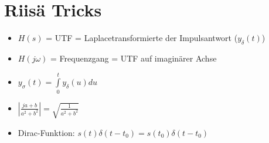 \section{Riisä Tricks}
\begin{itemize}
  \item $H(s)$ = UTF = Laplacetransformierte der Impulsantwort ($y_\delta(t)$)
  \item $H(j \omega)$ = Frequenzgang = UTF auf imaginärer Achse
  \item $y_\sigma(t) = \int\limits_0^t y_\delta(u)du$
  \item $\left| \frac{ja + b}{a^2 + b^2} \right| = \sqrt{\frac{1}{a^2 + b^2}}$
  \item Dirac-Funktion: $s(t)\delta(t-t_0) = s(t_0)\delta(t-t_0)$
\end{itemize}